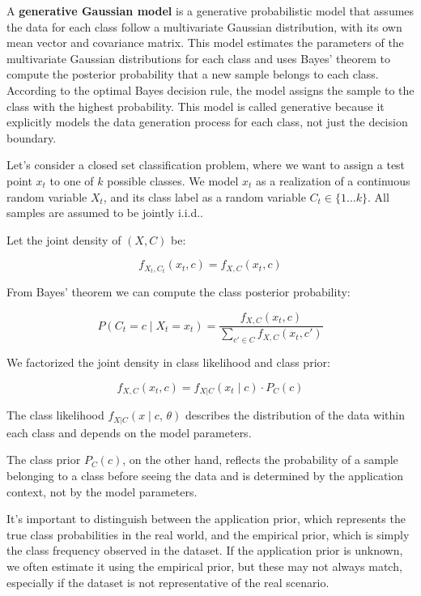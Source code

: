 
\setlength{\parindent}{0pt}  %
\setlength{\parskip}{0.7em}  %


A \textbf{generative Gaussian model} is a generative probabilistic model that assumes the data for each class follow a multivariate Gaussian distribution, with its own mean vector and covariance matrix.
This model estimates the parameters of the multivariate Gaussian distributions for each class and uses Bayes' theorem to compute the posterior probability that a new sample belongs to each class.
According to the optimal Bayes decision rule, the model assigns the sample to the class with the highest probability.
This model is called generative because it explicitly models the data generation process for each class, not just the decision boundary.

Let's consider a closed set classification problem, where we want to assign a test point $x_t$ to one of $k$ possible classes. We model $x_t$ as a realization of a continuous random variable $X_t$, and its class label as a random variable $C_t \in \{1 \ldots k\}$. All samples are assumed to be jointly i.i.d..

Let the joint density of $(X, C)$ be:

$$f_{X_t,C_t}(x_t, c) = f_{X,C}(x_t, c)$$

From Bayes' theorem we can compute the class posterior probability:

$$P(C_t = c \mid X_t = x_t) = \frac{f_{X,C}(x_t, c)}{\sum_{c' \in C} f_{X,C}(x_t, c')}$$

We factorized the joint density in class likelihood and class prior:

$$f_{X,C}(x_t, c) = f_{X|C}(x_t \mid c) \cdot P_C(c)$$

The class likelihood $f_{X|C}(x \mid c,\, \theta)$ describes the distribution of the data within each class and depends on the model parameters.

The class prior $P_C(c)$, on the other hand, reflects the probability of a sample belonging to a class before seeing the data and is determined by the application context, not by the model parameters.

It's important to distinguish between the application prior, which represents the true class probabilities in the real world, and the empirical prior, which is simply the class frequency observed in the dataset. If the application prior is unknown, we often estimate it using the empirical prior, but these may not always match, especially if the dataset is not representative of the real scenario.

